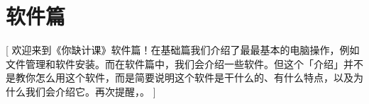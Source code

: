 \documentclass[a4paper]{book}
\begin{document}








\part{软件篇}[
  欢迎来到《你缺计课》软件篇！在基础篇我们介绍了最最基本的电脑操作，例如文件管理和软件安装。而在软件篇中，我们会介绍一些软件。但这个「介绍」并不是教你怎么用这个软件，而是简要说明这个软件是干什么的、有什么特点，以及为什么我们会介绍它。再次提醒，。
]



% 
% 
% 


% 
% 
% 
% 


% 
% 

% 
\end{document}

